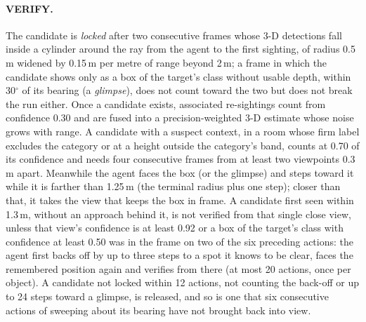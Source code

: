 \documentclass[10pt]{article}
\begin{document}
\paragraph{VERIFY.}
The candidate is \emph{locked} after two consecutive frames whose 3-D detections fall inside a cylinder around the ray
from the agent to the first sighting, of radius 0.5\,m widened by 0.15\,m per metre of range beyond 2\,m; a frame
in which the candidate shows only as a box of the target's class without usable depth, within 30$^\circ$ of its
bearing (a \emph{glimpse}), does not count toward the two but does not break the run either. Once a
candidate exists, associated re-sightings count from confidence 0.30 and are fused into a precision-weighted 3-D
estimate whose noise grows with range. A candidate with a suspect context, in a room whose firm label excludes the
category or at a height outside the category's band, counts at 0.70 of its confidence and needs four consecutive
frames from at least two viewpoints 0.3\,m apart. Meanwhile the agent faces the box (or the glimpse) and steps toward
it while it is farther than 1.25\,m (the terminal radius plus one step); closer than that, it takes the view that
keeps the box in frame. A candidate first seen within 1.3\,m, without an approach behind it, is not verified from that
single close view, unless that view's confidence is at least 0.92 or a box of the target's class with confidence at
least 0.50 was in the frame on two of the six preceding actions: the agent first backs off by up to three steps to a
spot it knows to be clear, faces the remembered position again and verifies from there (at most 20 actions, once per
object). A candidate not locked within 12
actions, not counting the back-off or up to 24 steps toward a glimpse, is released, and so is one that six
consecutive actions of sweeping about its bearing have not brought back into view.
\end{document}

